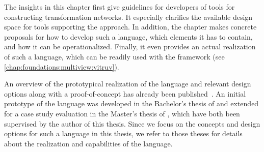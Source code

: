 
The insights in this chapter first give guidelines for developers of tools for constructing transformation networks.
It especially clarifies the available design space for tools supporting the \commonalities approach.
In addition, the chapter makes concrete proposals for how to develop such a language, which elements it has to contain, and how it can be operationalized.
Finally, it even provides an actual realization of such a language, which can be readily used with the \vitruv framework (see \autoref{chap:foundations:multiview:vitruv}).

An overview of the prototypical realization of the \commonalities language and relevant design options along with a proof-of-concept has already been published~.
An initial prototype of the language was developed in the Bachelor's thesis of  and extended for a case study evaluation in the Master's thesis of , which have both been supervised by the author of this thesis.
Since we focus on the concepts and design options for such a language in this thesis, we refer to those theses for details about the realization and capabilities of the \commonalities language.






